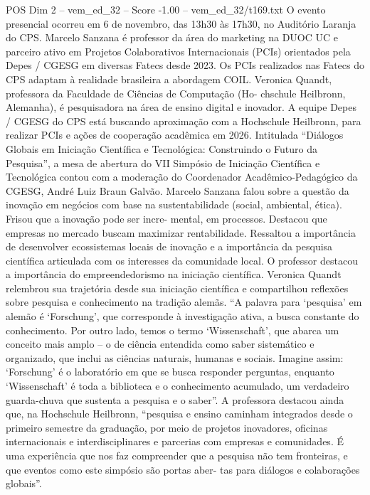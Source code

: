 \begin{textsample}{POS Dim 2 – vem\_ed\_32 – Score -1.00 – vem\_ed\_32/t169.txt}
O evento presencial ocorreu em 6 de novembro, das 13h30 às 17h30, no Auditório Laranja do CPS.
Marcelo Sanzana é professor da área do marketing na DUOC UC e parceiro ativo em Projetos Colaborativos Internacionais (PCIs) orientados pela Depes / CGESG em diversas Fatecs desde 2023.
Os PCIs realizados nas Fatecs do CPS adaptam à realidade brasileira a abordagem COIL.
Veronica Quandt, professora da Faculdade de Ciências de Computação (Ho- chschule Heilbronn, Alemanha), é pesquisadora na área de ensino digital e inovador.
A equipe Depes / CGESG do CPS está buscando aproximação com a Hochschule Heilbronn, para realizar PCIs e ações de cooperação acadêmica em 2026.
Intitulada “Diálogos Globais em Iniciação Científica e Tecnológica: Construindo o Futuro da Pesquisa”, a mesa de abertura do VII Simpósio de Iniciação Científica e Tecnológica contou com a moderação do Coordenador Acadêmico-Pedagógico da CGESG, André Luiz Braun Galvão.
Marcelo Sanzana falou sobre a questão da inovação em negócios com base na sustentabilidade (social, ambiental, ética).
Frisou que a inovação pode ser incre- mental, em processos.
Destacou que empresas no mercado buscam maximizar rentabilidade.
Ressaltou a importância de desenvolver ecossistemas locais de inovação e a importância da pesquisa científica articulada com os interesses da comunidade local.
O professor destacou a importância do empreendedorismo na iniciação científica.
Veronica Quandt relembrou sua trajetória desde sua iniciação científica e compartilhou reflexões sobre pesquisa e conhecimento na tradição alemãs. “A palavra para ‘pesquisa’ em alemão é ‘Forschung’, que corresponde à investigação ativa, a busca constante do conhecimento.
Por outro lado, temos o termo ‘Wissenschaft’, que abarca um conceito mais amplo – o de ciência entendida como saber sistemático e organizado, que inclui as ciências naturais, humanas e sociais.
Imagine assim: ‘Forschung’ é o laboratório em que se busca responder perguntas, enquanto ‘Wissenschaft’ é toda a biblioteca e o conhecimento acumulado, um verdadeiro guarda-chuva que sustenta a pesquisa e o saber”.
A professora destacou ainda que, na Hochschule Heilbronn, “pesquisa e ensino caminham integrados desde o primeiro semestre da graduação, por meio de projetos inovadores, oficinas internacionais e interdisciplinares e parcerias com empresas e comunidades.
É uma experiência que nos faz compreender que a pesquisa não tem fronteiras, e que eventos como este simpósio são portas aber- tas para diálogos e colaborações globais”.

\end{textsample}

